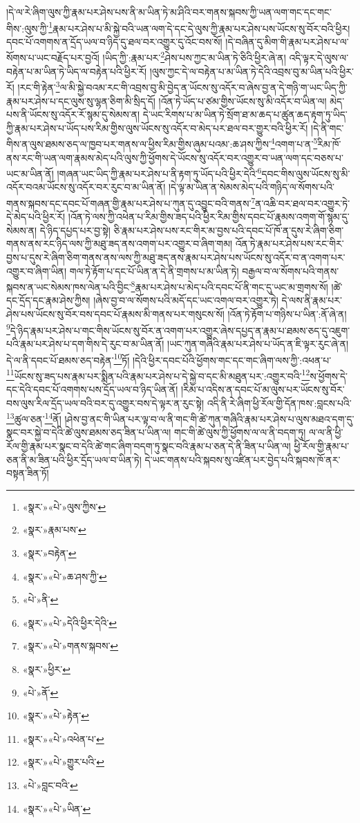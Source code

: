 །དེ་ལ་རེ་ཞིག་ལུས་ཀྱི་རྣམ་པར་ཤེས་པས་ནི་མ་ཡིན་ཏེ་མ་ཤིའི་བར་གནས་སྐབས་ཀྱི་ཡན་ལག་གང་དང་གང་གིས་:ལུས་ཀྱི་\footnote{«སྣར་»«པེ་»ལུས་ཀྱིས་}རྣམ་པར་ཤེས་པ་མི་སྐྱེ་བའི་ཡན་ལག་དེ་དང་དེ་ལུས་ཀྱི་རྣམ་པར་ཤེས་པས་ཡོངས་སུ་བོར་བའི་ཕྱིར། དབང་པོ་འགགས་ན་དྲོད་ཡལ་བ་ཉིད་དུ་ཐལ་བར་འགྱུར་དུ་འོང་བས་སོ། །དེ་བཞིན་དུ་མིག་གི་རྣམ་པར་ཤེས་པ་ལ་སོགས་པ་ཡང་བརྗོད་པར་བྱའོ། །ཡིད་ཀྱི་:རྣམ་པར་\footnote{«སྣར་»རྣམ་པས་}ཤེས་པས་ཀྱང་མ་ཡིན་ཏེ་ཅིའི་ཕྱིར་ཞེ་ན། འདི་ལྟར་དེ་ལུས་ལ་བརྟེན་པ་མ་ཡིན་ཏེ་ཡིད་ལ་བརྟེན་པའི་ཕྱིར་རོ། །ལུས་ཀྱང་དེ་ལ་བརྟེན་པ་མ་ཡིན་ཏེ་དེའི་འབྲས་བུ་མ་ཡིན་པའི་ཕྱིར་རོ། །རང་གི་རྟེན་\footnote{«སྣར་»བརྟེན་}ལ་མི་སྐྱེ་བའམ་རང་གི་འབྲས་བུ་མི་བྱེད་ན་ཡོངས་སུ་འདོར་བ་ཞེས་བྱ་ན་དེ་གཉི་ག་ཡང་ཡིད་ཀྱི་རྣམ་པར་ཤེས་པ་དང་ལུས་སུ་ལྷན་ཅིག་མི་སྲིད་དོ། །འོན་ཏེ་ཡོད་པ་ཙམ་གྱིས་ཡོངས་སུ་མི་འདོར་བ་ཡིན་ལ། མེད་པས་ནི་ཡོངས་སུ་འདོར་རོ་སྙམ་དུ་སེམས་ན། དེ་ཡང་རིགས་པ་མ་ཡིན་ཏེ་སྲོག་ཐ་མ་ཆད་པ་ཚུན་ཆད་རྟག་ཏུ་ཡིད་ཀྱི་རྣམ་པར་ཤེས་པ་ཡོད་པས་རིམ་གྱིས་ལུས་ཡོངས་སུ་འདོར་བ་མེད་པར་ཐལ་བར་གྱུར་བའི་ཕྱིར་རོ། །དེ་ནི་གང་གིས་ན་ལུས་ཐམས་ཅད་ལ་ཁྱབ་པར་གནས་ལ་ཕྱིས་རིམ་གྱིས་ཞུམ་པའམ་:ཆ་ཤས་ཀྱིས་\footnote{«སྣར་»«པེ་»ཆ་ཤས་ཀྱི་}འགག་པ་ན་\footnote{«པེ་»ནི་}རིམ་ཁོ་ནས་རང་གི་ཡན་ལག་རྣམས་མེད་པའི་ལུས་ཀྱི་ཕྱོགས་དེ་ཡོངས་སུ་འདོར་བར་འགྱུར་བ་ཡན་ལག་དང་བཅས་པ་ཡང་མ་ཡིན་ནོ། །གཞན་ཡང་ཡིད་ཀྱི་རྣམ་པར་ཤེས་པ་ནི་རྟག་ཏུ་ཡོད་པའི་ཕྱིར་དེའི་\footnote{«སྣར་»«པེ་»དེའི་ཕྱིར་དེའི་}དབང་གིས་ལུས་ཡོངས་སུ་མི་འདོར་བའམ་ཡོངས་སུ་འདོར་བར་རུང་བ་མ་ཡིན་ནོ། །དེ་ལྟ་མ་ཡིན་ན་སེམས་མེད་པའི་གཉིད་ལ་སོགས་པའི་གནས་སྐབས་དང་དབང་པོ་གཞན་གྱི་རྣམ་པར་ཤེས་པ་ཀུན་དུ་འབྱུང་བའི་གནས་\footnote{«སྣར་»«པེ་»གནས་སྐབས་}ན་འཆི་བར་ཐལ་བར་འགྱུར་ཏེ་དེ་མེད་པའི་ཕྱིར་རོ། །འོན་ཏེ་ལས་ཀྱི་འཕེན་པ་རིམ་གྱིས་ཟད་པའི་ཕྱིར་རིམ་གྱིས་དབང་པོ་རྣམས་འགག་གོ་སྙམ་དུ་སེམས་ན། དེ་ཉིད་དཔྱད་པར་བྱ་སྟེ། ཅི་རྣམ་པར་ཤེས་པས་རང་གིར་མ་བྱས་པའི་དབང་པོ་ཁོ་ན་དུས་རེ་ཞིག་ཅིག་གནས་ནས་རང་ཉིད་ལས་ཀྱི་མཐུ་ཟད་ནས་འགག་པར་འགྱུར་བ་ཞིག་གམ། འོན་ཏེ་རྣམ་པར་ཤེས་པས་རང་གིར་བྱས་པ་དུས་རེ་ཞིག་ཅིག་གནས་ནས་ལས་ཀྱི་མཐུ་ཟད་ནས་རྣམ་པར་ཤེས་པས་ཡོངས་སུ་འདོར་བ་ན་འགག་པར་འགྱུར་བ་ཞིག་ཡིན། གལ་ཏེ་རྟོག་པ་དང་པོ་ཡིན་ན་དེ་ནི་གྲགས་པ་མ་ཡིན་ཏེ། བརྒྱལ་བ་ལ་སོགས་པའི་གནས་སྐབས་ན་ཡང་སེམས་ཁས་ལེན་པའི་བྱིང་\footnote{«སྣར་»ཕྱིར་}རྣམ་པར་ཤེས་པ་མེད་པའི་དབང་པོ་ནི་གང་དུ་ཡང་མ་གྲགས་སོ། །ཚེ་དང་དྲོད་དང་རྣམ་ཤེས་ཀྱིས། །ཞེས་བྱ་བ་ལ་སོགས་པའི་མདོ་དང་ཡང་འགལ་བར་འགྱུར་ཏེ། དེ་ལས་ནི་རྣམ་པར་ཤེས་པས་ཡོངས་སུ་བོར་བས་དབང་པོ་རྣམས་མི་གནས་པར་གསུངས་སོ། །འོན་ཏེ་རྟོག་པ་གཉིས་པ་ཡིན་:ནོ་ཞེ་ན། \footnote{«པེ་»ནོ་}དེ་ཉིད་རྣམ་པར་ཤེས་པ་གང་གིས་ཡོངས་སུ་བོར་ན་འགག་པར་འགྱུར་ཞེས་དཔྱད་ན་རྣམ་པ་ཐམས་ཅད་དུ་འཇུག་པའི་རྣམ་པར་ཤེས་པ་དག་གིས་དེ་རུང་བ་མ་ཡིན་ནོ། །ཡང་ཀུན་གཞིའི་རྣམ་པར་ཤེས་པ་ཡོད་ན་ཇི་ལྟར་རུང་ཞེ་ན། དེ་ལ་ནི་དབང་པོ་ཐམས་ཅད་བརྟེན་\footnote{«སྣར་»«པེ་»རྟེན་}ཏོ། །དེའི་ཕྱིར་དབང་པོའི་ཕྱོགས་གང་དང་གང་ཞིག་ལས་ཀྱི་:འཕན་པ་\footnote{«སྣར་»«པེ་»འཕེན་པ་}ཡོངས་སུ་ཟད་པས་རྣམ་པར་སྨིན་པའི་རྣམ་པར་ཤེས་པ་དེ་སྐྱེ་བ་དང་མི་མཐུན་པར་:འགྱུར་བའི་\footnote{«སྣར་»«པེ་»གྱུར་པའི་}ས་ཕྱོགས་དེ་དང་དེའི་དབང་པོ་འགགས་པས་དྲོད་ཡལ་བ་ཉིད་ཡིན་ནོ། །རིམ་པ་འདིས་ན་དབང་པོ་མ་ལུས་པར་ཡོངས་སུ་བོར་བས་ལུས་རིལ་དྲོད་ཡལ་བའི་བར་དུ་འགྱུར་བས་དེ་ལྟར་ན་རུང་སྟེ། འདི་ནི་རེ་ཞིག་ཕྱི་རོལ་གྱི་དོན་ཁས་:བླངས་པའི་\footnote{«པེ་»བླང་བའི་}ཚུལ་ཅན་\footnote{«སྣར་»«པེ་»ཡིན་}ནོ། །ཤེས་བྱ་ནང་གི་ཡིན་པར་ལྟ་བ་ལ་ནི་གང་གི་ཚེ་ཀུན་གཞིའི་རྣམ་པར་ཤེས་པ་ལུས་མཐའ་དག་དུ་སྣང་བར་སྐྱེ་བ་དེའི་ཚེ་ལུས་ཐམས་ཅད་ཟིན་པ་ཡིན་ལ། གང་གི་ཚེ་ལུས་ཀྱི་ཕྱོགས་ལ་ལ་ནི་བདག་ཏུ། ལ་ལ་ནི་ཕྱི་རོལ་གྱི་རྣམ་པར་སྣང་བ་དེའི་ཚེ་གང་ཞིག་བདག་ཏུ་སྣང་བའི་རྣམ་པ་ཅན་དེ་ནི་ཟིན་པ་ཡིན་ལ། ཕྱི་རོལ་གྱི་རྣམ་པ་ཅན་ནི་མ་ཟིན་པའི་ཕྱིར་དྲོད་ཡལ་བ་ཡིན་ཏེ། དེ་ཡང་གནས་པའི་སྐབས་སུ་འཛིན་པར་བྱེད་པའི་སྐབས་ཁོ་ནར་བསྟན་ཟིན་ཏོ། 